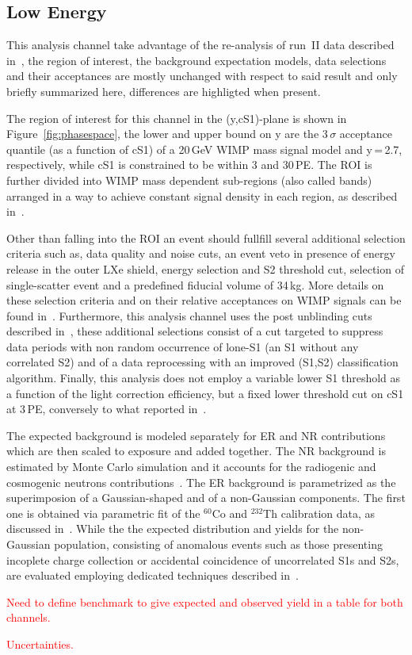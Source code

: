 
\subsection{Low Energy}
\label{subsec:LowE}
This analysis channel take advantage of the re-analysis of run~II data described in~\cite{xe100_run_combination}, the region of interest, the background 
expectation models, data selections and their acceptances are mostly unchanged with respect to said result and only briefly summarized here, 
differences are highligted when present. 

The region of interest for this channel in the (y,cS1)-plane is shown in Figure~\ref{fig:phasespace},  the lower and upper bound on y are the 
3\,$\sigma$ acceptance quantile (as a function of cS1) of a 20\,GeV WIMP mass signal model and y\,=\,2.7, respectively, while cS1 is 
constrained to be within 3 and 30\,PE. The ROI is further divided into WIMP mass dependent sub-regions (also called bands) arranged in a way 
to achieve constant signal density in each region, as described in~\cite{xe100_run_combination}.

Other than falling into the ROI an event should fullfill several additional selection criteria such as, data quality and noise cuts,
an event veto in presence of energy release in the outer LXe shield, energy selection and S2 threshold cut, 
selection of single-scatter event and a predefined fiducial volume of 34\,kg. More details on these selection criteria and on their 
relative acceptances on WIMP signals can be found in~\cite{Aprile:2012vw,xe100_run_combination}. 
Furthermore, this analysis channel uses the post unblinding cuts described in~\cite{xe100_run_combination}, 
these additional selections consist of a cut targeted to suppress data periods with non random occurrence of lone-S1 (an S1 without 
any correlated S2) and of a data reprocessing with an improved (S1,S2) classification algorithm.
Finally, this analysis does not employ a variable lower S1 threshold as a function of the light correction efficiency, but a fixed 
lower threshold cut on cS1 at 3\,PE, conversely to what reported in~\cite{xe100_run_combination}.

The expected background is modeled separately for ER and NR contributions which are then scaled to exposure and added together.
The NR background is estimated by Monte Carlo simulation and it accounts for the radiogenic and cosmogenic neutrons
contributions~\cite{Aprile:2013tov}.
The ER background is parametrized as the superimposion of a Gaussian-shaped and of a non-Gaussian components.
The first one is obtained via  parametric fit of the $^{60}$Co and $^{232}$Th calibration data, as discussed in~\cite{xe100_run10_si}.
While the the expected distribution and yields for the non-Gaussian population, consisting of anomalous events such as those 
presenting incoplete charge collection or accidental coincidence of uncorrelated S1s and S2s,  
are evaluated employing dedicated techniques described in~\cite{xe100_run_combination}.

\textcolor{red}{Need to define benchmark to give expected and observed yield in a table for both channels.}

\textcolor{red}{Uncertainties.}
